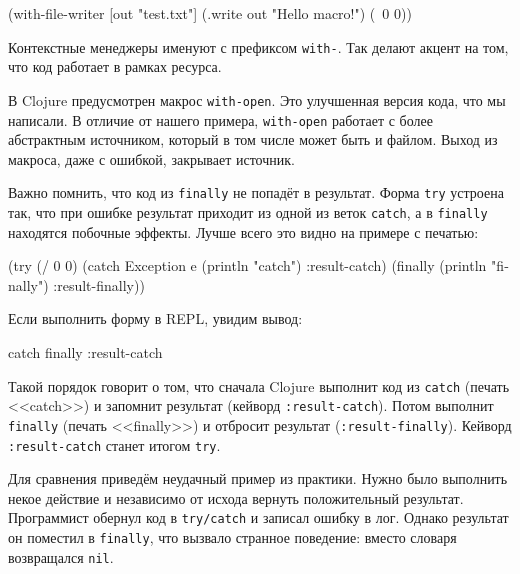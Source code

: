 \begin{english}
  \begin{clojure}
(with-file-writer [out "test.txt"]
  (.write out "Hello macro!")
  (\ 0 0))
  \end{clojure}
\end{english}

Контекстные менеджеры именуют с префиксом \verb|with-|. Так делают акцент на
том, что код работает в рамках ресурса.


В Clojure предусмотрен макрос \verb|with-open|. Это улучшенная версия кода, что
мы написали. В отличие от нашего примера, \verb|with-open| работает с более
абстрактным источником, который в том числе может быть и файлом. Выход из
макроса, даже с ошибкой, закрывает источник.

Важно помнить, что код из \verb|finally| не попадёт в результат. Форма
\verb|try| устроена так, что при ошибке результат приходит из одной из веток
\verb|catch|, а в \verb|finally| находятся побочные эффекты. Лучше всего это
видно на примере с печатью:

\begin{english}
  \begin{clojure}
(try (/ 0 0)
     (catch Exception e
       (println "catch")
       :result-catch)
     (finally
       (println "finally")
       :result-finally))
  \end{clojure}
\end{english}

\noindentnarrow
Если выполнить форму в REPL, увидим вывод:

\begin{english}
  \begin{clojure}
catch
finally
:result-catch
  \end{clojure}
\end{english}

Такой порядок говорит о том, что сначала Clojure выполнит код из \verb|catch|
(печать <<catch>>) и запомнит результат (кейворд \verb|:result-catch|). Потом выполнит
\verb|finally| (печать <<finally>>) и отбросит результат
(\verb|:result-finally|). Кейворд \verb|:result-catch| станет итогом \verb|try|.

Для сравнения приведём неудачный пример из практики. Нужно было выполнить некое
действие и независимо от исхода вернуть положительный результат. Программист
обернул код в \verb|try/catch| и записал ошибку в лог. Однако результат он
поместил в \verb|finally|, что вызвало странное поведение: вместо словаря
возвращался \verb|nil|.

